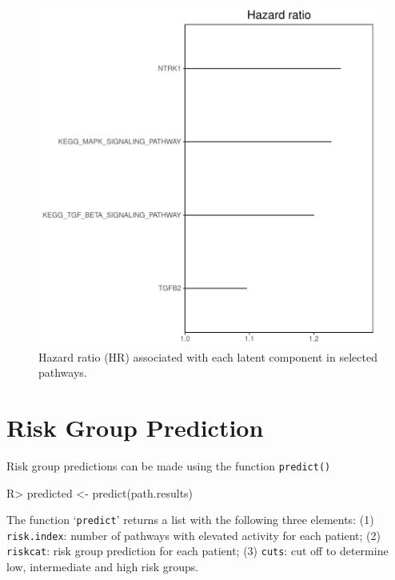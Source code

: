 \documentclass[11pt]{article}
\begin{document}
\begin{figure}[tbh]
\begin{center}
\includegraphics{INGRID-example-plot1}
\caption{Hazard ratio (HR) associated with each latent component in selected pathways.}
\end{center}
\end{figure}

\section{Risk Group Prediction}
Risk group predictions can be made using the function \texttt{predict()}

\begin{Schunk}
\begin{Sinput}
R> predicted <- predict(path.results)
\end{Sinput}
\end{Schunk}

The function `\texttt{predict}' returns a list with the following three elements:
(1) \texttt{risk.index}: number of pathways with elevated activity for each patient;
(2) \texttt{riskcat}: risk group prediction for each patient;
(3) \texttt{cuts}: cut off to determine low, intermediate and high risk groups.
\end{document}
